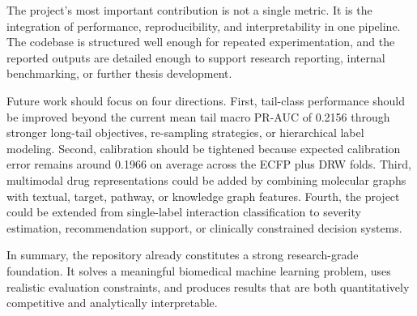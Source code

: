 \documentclass[12pt,a4paper]{report}
\begin{document}
The project's most important contribution is not a single metric. It is the integration of performance, reproducibility, and interpretability in one pipeline. The codebase is structured well enough for repeated experimentation, and the reported outputs are detailed enough to support research reporting, internal benchmarking, or further thesis development.

Future work should focus on four directions. First, tail-class performance should be improved beyond the current mean tail macro PR-AUC of 0.2156 through stronger long-tail objectives, re-sampling strategies, or hierarchical label modeling. Second, calibration should be tightened because expected calibration error remains around 0.1966 on average across the ECFP plus DRW folds. Third, multimodal drug representations could be added by combining molecular graphs with textual, target, pathway, or knowledge graph features. Fourth, the project could be extended from single-label interaction classification to severity estimation, recommendation support, or clinically constrained decision systems.

In summary, the repository already constitutes a strong research-grade foundation. It solves a meaningful biomedical machine learning problem, uses realistic evaluation constraints, and produces results that are both quantitatively competitive and analytically interpretable.
\end{document}
